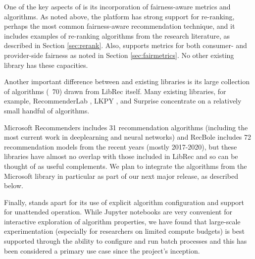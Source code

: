 One of the key aspects of \libauto{} is its incorporation of fairness-aware metrics and algorithms. As noted above, the platform has strong support for re-ranking, perhaps the most common fairness-aware recommendation technique, and it includes examples of re-ranking algorithms from the research literature, as described in Section \ref{sec:rerank}. Also, \libauto{} supports metrics for both consumer- and provider-side fairness as noted in Section \ref{sec:fairmetrics}. No other existing library has these capacities. 

Another important difference between \libauto{} and existing libraries is its large collection of algorithms (~70) drawn from LibRec itself. Many existing libraries, for example, RecommenderLab \cite{hahsler2015recommenderlab}, LKPY \cite{LensKit2020}, and Surprise \cite{Hug2020} concentrate on a relatively small handful of algorithms.

Microsoft Recommenders \cite{MicrosoftRecommenders} includes 31 recommendation algorithms (including the most current work in deeplearning and neural networks) and RecBole \cite{recbole} includes 72 recommendation models from the recent years (mostly 2017-2020), but these libraries have almost no overlap with those included in LibRec and so can be thought of as useful complements. We plan to integrate the algorithms from the Microsoft library in particular as part of our next major release, as described below.


Finally, \libauto{} stands apart for its use of explicit algorithm configuration and support for unattended operation. While Jupyter notebooks are very convenient for interactive exploration of algorithm properties, we have found that large-scale experimentation (especially for researchers on limited compute budgets) is best supported through the ability to configure and run batch processes and this has been considered a primary use case since the project's inception.


